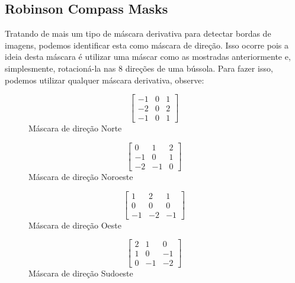 \documentclass[a4paper, 12pt]{article}
\begin{document}
\subsection{Robinson Compass Masks}
Tratando de mais um tipo de máscara derivativa para detectar bordas de imagens, podemos identificar esta como máscara de direção. Isso ocorre pois 
a ideia desta máscara é utilizar uma máscar como as mostradas anteriormente e, simplesmente, rotacioná-la nas $8$ direções de uma bússola. Para fazer isso, 
podemos utilizar qualquer máscara derivativa, observe:
\begin{figure}[!htb]
	\begin{minipage}{.23\linewidth}
	  \centering
	  \[\left[\begin{array}{ccc}
		-1 & 0 & 1 \\
		-2 & 0 & 2 \\
		-1 & 0 & 1
	  \end{array}\right]\]
	  Máscara de direção Norte
	\end{minipage}%
	\begin{minipage}{.23\linewidth}
	  \centering
	  \[\left[\begin{array}{ccc}
		 0 & 1  & 2 \\
		-1 & 0  & 1 \\
		-2 & -1 & 0
	  \end{array}\right]\]
	  Máscara de direção Noroeste
	\end{minipage}
	\begin{minipage}{.23\linewidth}
		\centering
		\[\left[\begin{array}{ccc}
		   1 &  2  &  1 \\
		   0 &  0  &  0 \\
		  -1 & -2  & -1
		\end{array}\right]\]
		Máscara de direção Oeste
	  \end{minipage}
	  \begin{minipage}{.23\linewidth}
		\centering
		\[\left[\begin{array}{ccc}
		   2 &   1   &   0 \\
		   1 &   0   &  -1 \\
		   0 &  -1   &  -2
		\end{array}\right]\]
		Máscara de direção Sudoeste
	  \end{minipage}
\end{figure}
\end{document}

